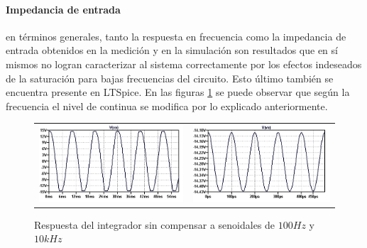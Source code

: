 \paragraph*{Impedancia de entrada} en t\'erminos generales, tanto la respuesta en frecuencia como la impedancia de entrada
obtenidos en la medici\'on y en la simulaci\'on son resultados que en s\'i mismos no logran caracterizar al sistema correctamente por los efectos indeseados
de la saturaci\'on para bajas frecuencias del circuito. Esto \'ultimo tambi\'en se encuentra presente en LTSpice. En las figuras \ref{fig:integrador_simulacion} se puede observar
que seg\'un la frecuencia el nivel de continua se modifica por lo explicado anteriormente.

\begin{figure}[H]
	\centering
	\begin{tabular}{c c}
		\includegraphics[scale=0.55]{Integrador/Simulaciones/Seno100.png} &
		\includegraphics[scale=0.55]{Integrador/Simulaciones/Seno10k.png}
	\end{tabular}
	\caption{Respuesta del integrador sin compensar a senoidales de $100Hz$ y $10kHz$}
	\label{fig:integrador_simulacion}
\end{figure}

